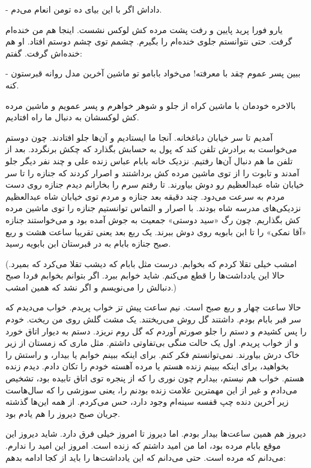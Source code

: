\documentclass[12pt,a4paper]{book}
\begin{document}
- داداش اگر با این بیای ده تومن انعام می‌دم.

یارو فورا پرید پایین و رفت پشت مرده کش لوکس نشست. اینجا هم من خنده‌ام گرفت. حتی نتوانستم جلوی خنده‌ام را بگیرم. چشمم توی چشم دوستم افتاد. او هم خنده‌اش گرفت. گفتم:

- ببین پسر عموم چقد با معرفته! می‌خواد بابامو تو ماشین آخرین مدل روانه قبرستون کنه.

بالاخره خودمان با ماشین کراه از جلو و شوهر خواهرم و پسر عمویم و ماشین مرده کش لوکسشان به دنبال ما راه افتادیم.

آمدیم تا سر خیابان دباغخانه. آنجا ما ایستادیم و آن‌ها جلو افتادند. چون دوستم می‌خواست به برادرش تلفن کند که پول به حسابش بگذارد که چکش برنگردد. بعد از تلفن ما هم دنبال آن‌ها رفتیم. نزدیک خانه بابام عباس زنده علی و چند نفر دیگر جلو آمدند و تابوت را از توی ماشین مرده کش برداشتند و اصرار کردند که جنازه را تا سر خیابان شاه عبدالعظیم رو دوش بیاورند. تا رفتم سرم را بخارانم دیدم جنازه روی دست مردم به سرعت می‌دود. چند دقیقه بعد جنازه و مردم توی خیابان شاه عبدالعظیم نزدیکی‌های مدرسه شاه بودند. با اصرار و التماس توانستیم جنازه را توی ماشین مرده کش بگذاریم. چون رگ «سید دوستی» جمعیت به جوش آمده بود و می‌خواستند جنازه «آقا نمکی» را تا ابن بابویه روی دوش ببرند. یک ربع بعد یعنی تقریبا ساعت هشت و ربع صبح جنازه بابام به در قبرستان ابن بابویه رسید.

(امشب خیلی تقلا کردم که بخوابم. درست مثل بابام که دیشب تقلا می‌کرد که بمیرد. حالا این یادداشت‌ها را قطع می‌کنم. شاید خوابم ببرد. اگر بتوانم بخوابم فردا صبح دنبالش را می‌نویسم و اگر نشد که همین امشب.)

حالا ساعت چهار و ربع صبح است. نیم ساعت پیش تز خواب پریدم. خواب می‌دیدم که سر قبر بابام بودم. داشتند گل روش می‌ریختند. یک مشت گلش روی من ریخت. خودم را پس کشیدم و دستم را جلو صورتم آوردم که گل روم نریزد. دستم به دیوار اتاق خورد و از خواب پریدم. اول یک حالت منگی بی‌تفاوتی داشتم. مثل ماری که زمستان از زیر خاک درش بیاورند. نمی‌توانستم فکر کنم. برای اینکه ببینم خوابم یا بیدار، و راستش را بخواهید، برای اینکه ببینم زنده هستم یا مرده آهسته خودم را تکان دادم. دیدم زنده هستم. خواب هم نیستم، بیدارم چون نوری را که از پنجره توی اتاق تابیده بود، تشخیص می‌دادم و غیر از این مهمترین علامت زنده بودنم را، یعنی سوزشی را که سال‌هاست زیر آخرین دنده چپ قفسه سینه‌ام وجود دارد، حس می‌کردم. از همه این‌ها گذشته جریان صبح دیروز را هم یادم بود.

دیروز هم همین ساعت‌ها بیدار بودم. اما دیروز تا امروز خیلی فرق دارد. شاید دیروز این موقع بابام مرده بود، اما من امید داشتم که زنده است. امروز این امید را ندارم. می‌دانم که مرده است. حتی می‌دانم که این یادداشت‌ها را باید از کجا ادامه بدهم:
\end{document}
